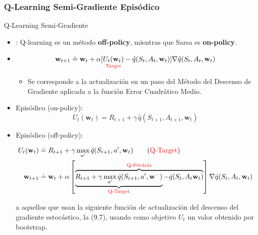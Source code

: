 \documentclass[10pt, envcountsect, handout, aspectratio=1610, hyperref={hypertexnames=true}]{beamer}
\begin{document}
\subsubsection{Q-Learning Semi-Gradiente Episódico}


	
\begin{frame}{Q-Learning Semi-Gradiente}
	\begin{itemize}
		\item {}: Q-learning es un método \textbf{off-policy}, mientras que Sarsa es \textbf{on-policy}.
		
		\item {} 
		{$$
			\mathbf{w}_{t+1} \doteq \mathbf{w}_t + \alpha [ \underset{\text{\color{red} Target}}{U_t(\mathbf{w}_t)} - \hat{q}(S_t, A_t, \mathbf{w}_t) ] \nabla \hat{q}(S_t, A_t, \mathbf{w}_t)
			$$}
		\begin{itemize}
			\item Se corresponde a la actualización en un paso del Método del Descenso de Gradiente aplicada a la función Error Cuadrático Medio.
		\end{itemize}
		
		\item Episódico  (on-policy): $$U_t(\mathbf{w}_t) = R_{t+1} + \gamma \, \hat{q}(S_{t+1}, A_{t+1}, \mathbf{w}_t)$$ 
		

		
		\item Episódico  (off-policy):
		
		\begin{align*}
			U_t(\mathbf{w}_t) & \doteq R_{t+1} + \gamma \max_{a'} \hat{q}(S_{t+1}, a', \mathbf{w}_t) \qquad \text{(\color{red}Q-Target})\\
			\mathbf{w}_{t+1} & \doteq \mathbf{w}_t + \alpha \left[ 
			\overbrace{
			\underbrace{ R_{t+1} + \gamma \max_{a'} \hat{q}(S_{t+1}, a', \mathbf{w}^-)}_{\text{\color{red}Q-Target}} - \hat{q}(S_t, A_t \mathbf{w}_t)}^{\text{\color{red}Q-Pérdida}} \right] \nabla \hat{q}(S_t, A_t, \mathbf{w}_t)
		\end{align*}
			
		
		
		 a aquellos que usan la siguiente función de actualización del descenso del gradiente estocástico, la (9.7), usando como objetivo $U_t$ un valor obtenido por bootstrap.
		 

\end{itemize}
\end{frame}
\end{document}
